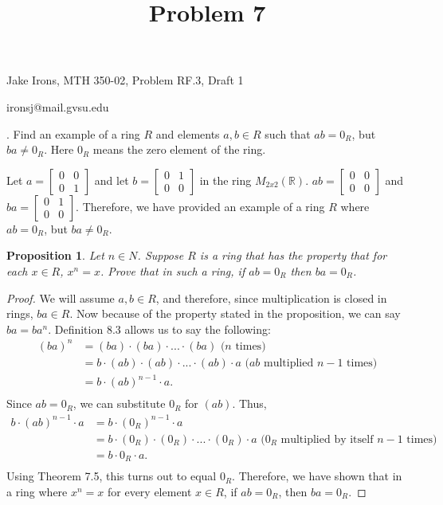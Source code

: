 \documentclass[11 pt]{article}
\title{Problem 7}
\newtheorem{proposition}{Proposition}
\newcommand{\newpar}{\vspace{.15in}\noindent}
\begin{document}
\noindent Jake Irons, MTH 350-02, Problem RF.3, Draft 1

\noindent ironsj@mail.gvsu.edu

\newpar
1.  Find an example of a ring $R$ and elements $a, b \in R$ such that $ab = 0_R$, but $ba \not= 0_R$. Here $0_R$ means the zero element of the ring.

\newpar
Let $a= \begin{bmatrix}
    0 & 0 \\
    0 & 1
  \end{bmatrix}$ and let $b= \begin{bmatrix}
    0 & 1 \\
    0 & 0
  \end{bmatrix}$ in the ring $M_{2x2}(\mathbb{R})$. $ab=\begin{bmatrix}
    0 & 0 \\
    0 & 0
  \end{bmatrix}$ and $ba= \begin{bmatrix}
    0 & 1 \\
    0 & 0
  \end{bmatrix}$. Therefore, we have provided an example of a ring $R$ where $ab=0_R$, but $ba\not=0_R$.


\newpar
\begin{proposition}
Let $n \in N$. Suppose $R$ is a ring that has the property that for each $x \in R$, $x^n = x$. Prove that in such
a ring, if $ab = 0_R$ then $ba = 0_R$.
\end{proposition}
\begin{proof}
We will assume $a,b \in R$, and therefore, since multiplication is closed in rings, $ba \in R$. Now because of the property stated in the proposition, we can say $ba=ba^n$. Definition 8.3 allows us to say the following:
\begin{align*}
(ba)^n&=(ba)\cdot (ba)\cdot . . . \cdot (ba) \text{    ($n$ times)} \\
&=b\cdot (ab)\cdot (ab)\cdot . . . \cdot (ab)\cdot a  \text{   ($ab$ multiplied $n-1$ times)} \\
&=b\cdot (ab)^{n-1} \cdot a. \\
\end{align*}
\noindent
Since $ab=0_R$, we can substitute $0_R$ for $(ab)$. Thus,
\begin{align*}
b\cdot (ab)^{n-1} \cdot a&=b\cdot (0_R)^{n-1} \cdot a \\
&=b\cdot (0_R)\cdot (0_R)\cdot . . .\cdot (0_R)\cdot a \text{    ($0_R$ multiplied by itself $n-1$ times)} \\ 
&=b\cdot 0_R\cdot a. \\
\end{align*}
\newpar
Using Theorem 7.5, this turns out to equal $0_R$. Therefore, we have shown that in a ring where $x^n=x$ for every element $x\in R$, if $ab=0_R$, then $ba=0_R$.
\end{proof}
\end{document}
